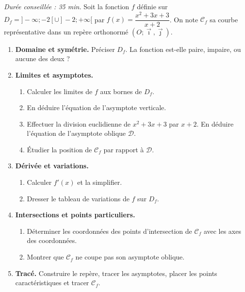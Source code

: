 \documentclass[11pt]{article}
\begin{document}
\begin{exercice}
\emph{Durée conseillée : 35 min.}
Soit la fonction $f$ définie sur $D_f=]-\infty;-2[\cup]-2;+\infty[$ par $f(x)=\dfrac{x^2+3x+3}{x+2}$.
On note $\mathcal{C}_f$ sa courbe représentative dans un repère orthonormé $(O;\vec{\imath},\vec{\jmath})$.
\begin{enumerate}
\item \textbf{Domaine et symétrie.} Préciser $D_f$. La fonction est-elle paire, impaire, ou aucune des deux ?
\item \textbf{Limites et asymptotes.}
\begin{enumerate}
\item Calculer les limites de $f$ aux bornes de $D_f$.
\item En déduire l'équation de l'asymptote verticale.
\item Effectuer la division euclidienne de $x^2+3x+3$ par $x+2$. En déduire l'équation de l'asymptote oblique $\mathcal{D}$.
\item Étudier la position de $\mathcal{C}_f$ par rapport à $\mathcal{D}$.
\end{enumerate}
\item \textbf{Dérivée et variations.}
\begin{enumerate}
\item Calculer $f'(x)$ et la simplifier.
\item Dresser le tableau de variations de $f$ sur $D_f$.
\end{enumerate}
\item \textbf{Intersections et points particuliers.}
\begin{enumerate}
\item Déterminer les coordonnées des points d'intersection de $\mathcal{C}_f$ avec les axes des coordonnées.
\item Montrer que $\mathcal{C}_f$ ne coupe pas son asymptote oblique.
\end{enumerate}
\item \textbf{Tracé.} Construire le repère, tracer les asymptotes, placer les points caractéristiques et tracer $\mathcal{C}_f$.
\end{enumerate}
\end{exercice}
\end{document}
